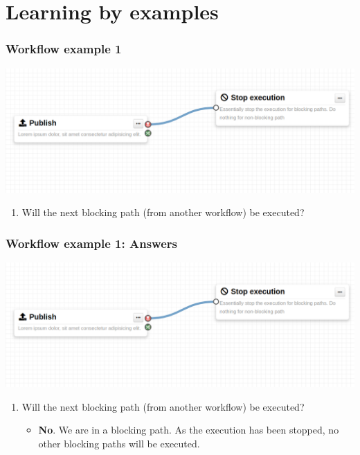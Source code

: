 \section{Learning by examples}
\begin{frame}
    \frametitle{Workflow example 1}
    \begin{center}
        \includegraphics[width=0.9\linewidth]{pictures/example-1.png}
    \end{center}

    \begin{enumerate}
        \item Will the next blocking path (from another workflow) be executed?
    \end{enumerate}
\end{frame}
\begin{frame}
    \frametitle{Workflow example 1: Answers}
    \begin{center}
        \includegraphics[width=0.9\linewidth]{pictures/example-1.png}
    \end{center}

    \begin{enumerate}
        \item Will the next blocking path (from another workflow) be executed?
        \begin{itemize}
            \item \textbf{No}. We are in a blocking path. As the execution has been stopped, no other blocking paths will be executed.
        \end{itemize}
    \end{enumerate}
\end{frame}

